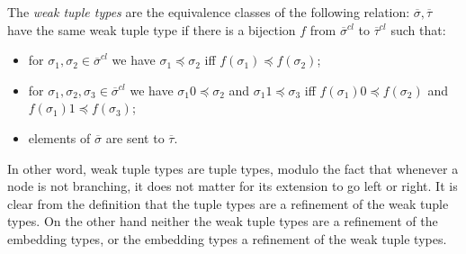 \begin{definition}
The \emph{weak tuple types} are the equivalence classes of the following relation: $\overline{\sigma}, \overline{\tau}$ have the same weak tuple type if there is a bijection $f$ from $\overline{\sigma}^{cl}$ to $\overline{\tau}^{cl}$ such that:
\begin{itemize}
\item for $\sigma_1,\sigma_2 \in \overline{\sigma}^{cl}$ we have $\sigma_1 \preceq \sigma_2$ iff $f(\sigma_1) \preceq f(\sigma_2)$;
\item for $\sigma_1,\sigma_2,\sigma_3 \in \overline{\sigma}^{cl}$ we have $\sigma_1 0 \preceq \sigma_2$ and $\sigma_1 1 \preceq \sigma_3$ iff $f(\sigma_1) 0 \preceq f(\sigma_2)$ and $f(\sigma_1) 1 \preceq f(\sigma_3)$;
\item elements of $\overline{\sigma}$ are sent to $\overline{\tau}$.
\end{itemize}
\end{definition}

In other word, weak tuple types are tuple types, modulo the fact that whenever a node is not branching, it does not matter for its extension to go left or right. It is clear from the definition that the tuple types are a refinement of the weak tuple types. On the other hand neither the weak tuple types are a refinement of the embedding types, or the embedding types a refinement of the weak tuple types.

